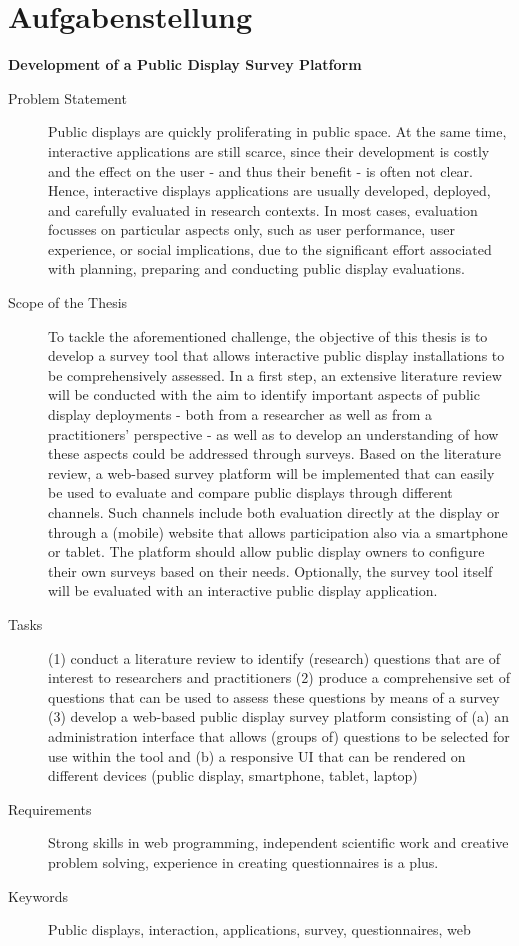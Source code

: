 \section*{Aufgabenstellung} %
\label{aufgabenstellung}

\textbf{Development of a Public Display Survey Platform}

\begin{description}
    \item[Problem Statement] Public displays are quickly proliferating in public space. At the same time, interactive applications are still scarce, since their development is costly and the effect on the user - and thus their benefit - is often not clear. Hence, interactive displays applications are usually developed, deployed, and carefully evaluated in research contexts. In most cases, evaluation focusses on particular aspects only, such as user performance, user experience, or social implications, due to the significant effort associated with planning, preparing and conducting public display evaluations.
    \item[Scope of the Thesis] To tackle the aforementioned challenge, the objective of this thesis is to develop a survey tool that allows interactive public display installations to be comprehensively assessed. In a first step, an extensive literature review will be conducted with the aim to identify important aspects of public display deployments - both from a researcher as well as from a practitioners' perspective - as well as to develop an understanding of how these aspects could be addressed through surveys. Based on the literature review, a web-based survey platform will be implemented that can easily be used to evaluate and compare public displays through different channels. Such channels include both evaluation directly at the display or through a (mobile) website that allows participation also via a smartphone or tablet. The platform should allow public display owners to configure their own surveys based on their needs. Optionally, the survey tool itself will be evaluated with an interactive public display application.

    \item[Tasks] 
    (1) conduct a literature review to identify (research) questions that are of interest to researchers and practitioners \newline
(2) produce a comprehensive set of questions that can be used to assess these questions by means of a survey \newline
(3) develop a web-based public display survey platform consisting of (a) an administration interface that allows (groups of) questions to be selected for use within the tool and
(b) a responsive UI that can be rendered on different devices (public display, smartphone, tablet, laptop)

    \item[Requirements] Strong skills in web programming, independent scientific work and creative problem solving, experience in creating questionnaires is a plus.

    \item[Keywords] Public displays, interaction, applications, survey, questionnaires, web

\end{description}